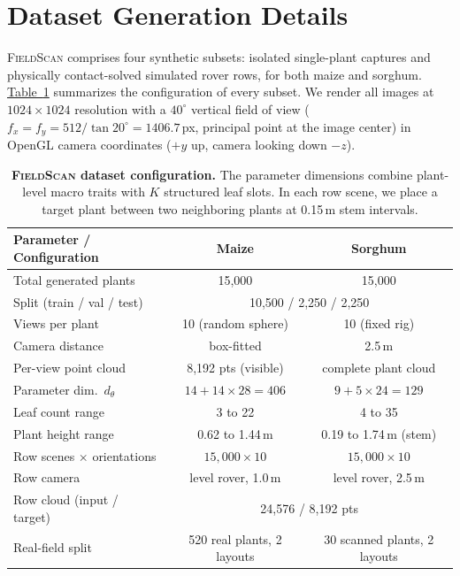 \documentclass[10pt,twocolumn,letterpaper]{article}
\newcommand{\tabref}[1]{\hyperref[#1]{Table~\ref*{#1}}}
\newcommand{\dataset}{\textup{\textsc{FieldScan}}}
\begin{document}
\section{Dataset Generation Details}
\label{app:data}

\dataset{} comprises four synthetic subsets: isolated single-plant captures and physically contact-solved simulated rover rows, for both maize and sorghum. \tabref{tab:fieldproc} summarizes the configuration of every subset. We render all images at $1024 \times 1024$ resolution with a $40^\circ$ vertical field of view ($f_x = f_y = 512 / \tan 20^\circ = 1406.7$\,px, principal point at the image center) in OpenGL camera coordinates ($+y$ up, camera looking down $-z$).

\begin{table}[t]
  \caption{\textbf{\dataset{} dataset configuration.} The parameter dimensions combine plant-level macro traits with $K$ structured leaf slots. In each row scene, we place a target plant between two neighboring plants at 0.15\,m stem intervals.}
  \label{tab:fieldproc}
  \centering\scriptsize
  \setlength{\tabcolsep}{2pt}
  \begin{tabular}{lcc}
    \toprule
    Parameter / Configuration & Maize & Sorghum \\
    \midrule
    Total generated plants & 15{,}000 & 15{,}000 \\
    Split (train / val / test) & \multicolumn{2}{c}{10{,}500 / 2{,}250 / 2{,}250} \\
    Views per plant & 10 (random sphere) & 10 (fixed rig) \\
    Camera distance & box-fitted & 2.5\,m \\
    Per-view point cloud & 8{,}192 pts (visible) & complete plant cloud \\
    Parameter dim.\ $d_\theta$ & $14{+}14{\times}28{=}406$ & $9{+}5{\times}24{=}129$ \\
    Leaf count range & 3 to 22 & 4 to 35 \\
    Plant height range & 0.62 to 1.44\,m & 0.19 to 1.74\,m (stem) \\
    Row scenes $\times$ orientations & $15{,}000 \times 10$ & $15{,}000 \times 10$ \\
    Row camera & level rover, 1.0\,m & level rover, 2.5\,m \\
    Row cloud (input / target) & \multicolumn{2}{c}{24{,}576 / 8{,}192 pts} \\
    Real-field split & 520 real plants, 2 layouts & 30 scanned plants, 2 layouts \\
    \bottomrule
  \end{tabular}
\end{table}
\end{document}
